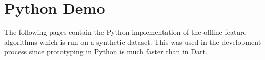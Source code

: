 \chapter{Python Demo}
\label{appendix:python-demo}
The following pages contain the Python implementation of the offline feature algorithms which is run on a synthetic dataset. This was used in the development process since prototyping in Python is much faster than in Dart.

